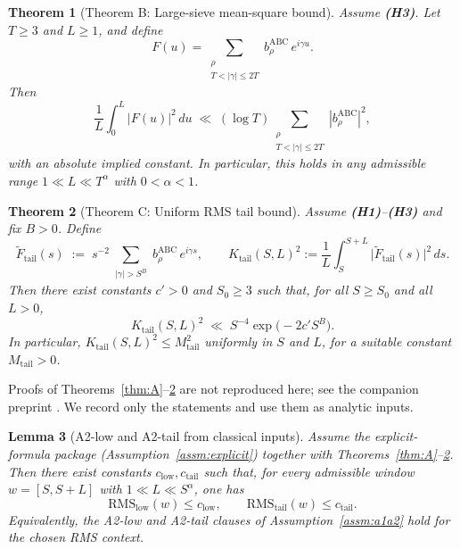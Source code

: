 \documentclass[11pt]{article}
\theoremstyle{plain}
\newtheorem{theorem}{Theorem}[section]
\newtheorem{lemma}[theorem]{Lemma}
\theoremstyle{definition}
\newcommand{\brhoABC}{b_\rho^{\mathrm{ABC}}}
\newcommand{\code}[1]{\path{#1}}
\begin{document}
\begin{theorem}[Theorem B: Large-sieve mean-square bound]\label{thm:B}
Assume \textbf{(H3)}. Let $T\ge 3$ and $L\ge 1$, and define
\[
  F(u) = \sum_{\substack{\rho\\ T<|\gamma|\le 2T}} \brhoABC\, e^{i\gamma u}.
\]
Then
\[
  \frac{1}{L} \int_0^L |F(u)|^2 \, du
    \;\ll\; (\log T)\sum_{\substack{\rho\\ T<|\gamma|\le 2T}} |\brhoABC|^2,
\]
with an absolute implied constant. In particular, this holds in any admissible
range $1\ll L\ll T^\alpha$ with $0<\alpha<1$.
\end{theorem}

\begin{theorem}[Theorem C: Uniform RMS tail bound]\label{thm:C}
Assume \textbf{(H1)}--\textbf{(H3)} and fix $B>0$. Define
\[
  \widetilde F_{\mathrm{tail}}(s)
  \;:=\; s^{-2} \sum_{\substack{|\gamma|>S^B}} \brhoABC\, e^{i\gamma s},
  \qquad
  K_{\mathrm{tail}}(S,L)^2
  := \frac{1}{L} \int_{S}^{S+L} \bigl|\widetilde F_{\mathrm{tail}}(s)\bigr|^2\,ds.
\]
Then there exist constants $c'>0$ and $S_0\ge 3$ such that, for all
$S\ge S_0$ and all $L>0$,
\[
  K_{\mathrm{tail}}(S,L)^2 \;\ll\; S^{-4}\exp\!\bigl(-2c' S^{B}\bigr).
\]
In particular, $K_{\mathrm{tail}}(S,L)^2\le M_{\mathrm{tail}}^2$ uniformly in
$S$ and $L$, for a suitable constant $M_{\mathrm{tail}}>0$.
\end{theorem}

\noindent Proofs of Theorems~\ref{thm:A}--\ref{thm:C} are not reproduced here;
see the companion preprint \code{Theorem}\allowbreak\code{_ABC}\allowbreak\code{_preprint.tex}. We record only
the statements and use them as analytic inputs.

\begin{lemma}[A2-low and A2-tail from classical inputs]\label{lem:a2-from-abc}
Assume the explicit-formula package (Assumption~\ref{assm:explicit}) together
with Theorems~\ref{thm:A}--\ref{thm:C}. Then there exist constants
$c_{\mathrm{low}}, c_{\mathrm{tail}}$ such that, for every admissible window
$w=[S,S+L]$ with $1\ll L\ll S^\alpha$, one has
\[
  \mathrm{RMS}_{\mathrm{low}}(w) \le c_{\mathrm{low}},
  \qquad
  \mathrm{RMS}_{\mathrm{tail}}(w) \le c_{\mathrm{tail}}.
\]
Equivalently, the A2-low and A2-tail clauses of Assumption~\ref{assm:a1a2}
hold for the chosen RMS context.
\end{lemma}
\end{document}

